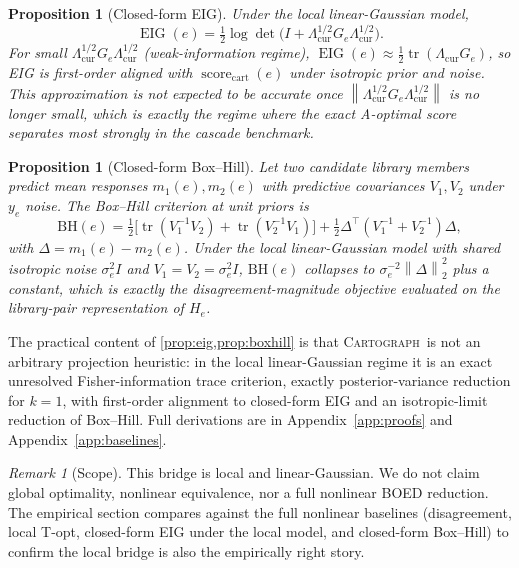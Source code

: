 \documentclass{article}
\newcommand{\method}{\textsc{Cartograph}}
\newcommand{\scorecart}{\operatorname{score}_{\mathrm{cart}}}
\newcommand{\tr}{\operatorname{tr}}
\newcommand{\EIG}{\operatorname{EIG}}
\newcommand{\norm}[1]{\left\lVert #1 \right\rVert}
\theoremstyle{plain}
\newtheorem{proposition}[theorem]{Proposition}
\theoremstyle{definition}
\theoremstyle{remark}
\newtheorem{remark}[theorem]{Remark}
\begin{document}
\begin{proposition}[Closed-form EIG]
\label{prop:eig}
Under the local linear-Gaussian model,
\begin{equation}
\EIG(e) = \tfrac{1}{2}\log\det\!\big(I+\Lambda_{\mathrm{cur}}^{1/2}G_e\Lambda_{\mathrm{cur}}^{1/2}\big).
\label{eq:eig}
\end{equation}
For small $\Lambda_{\mathrm{cur}}^{1/2}G_e\Lambda_{\mathrm{cur}}^{1/2}$
(weak-information regime), $\EIG(e)\approx\tfrac{1}{2}\tr(\Lambda_{\mathrm{cur}}G_e)$,
so EIG is first-order aligned with $\scorecart(e)$ under isotropic prior
and noise. This approximation is not expected to be accurate once
$\norm{\Lambda_{\mathrm{cur}}^{1/2}G_e\Lambda_{\mathrm{cur}}^{1/2}}$ is no
longer small, which is exactly the regime where the exact A-optimal score
separates most strongly in the cascade benchmark.
\end{proposition}

\begin{proposition}[Closed-form Box--Hill]
\label{prop:boxhill}
Let two candidate library members predict mean responses $m_1(e),m_2(e)$
with predictive covariances $V_1,V_2$ under $y_e$ noise. The Box--Hill
criterion \citep{boxhill1967} at unit priors is
\begin{equation}
\mathrm{BH}(e)=\tfrac{1}{2}\big[\tr(V_1^{-1}V_2)+\tr(V_2^{-1}V_1)\big]+\tfrac{1}{2}\Delta^\top(V_1^{-1}+V_2^{-1})\Delta,
\label{eq:bh}
\end{equation}
with $\Delta=m_1(e)-m_2(e)$. Under the local linear-Gaussian model with
shared isotropic noise $\sigma_e^2 I$ and $V_1\!=\!V_2\!=\!\sigma_e^2 I$,
$\mathrm{BH}(e)$ collapses to
$\sigma_e^{-2}\norm{\Delta}_2^2$ plus a constant, which is exactly the
disagreement-magnitude objective evaluated on the library-pair
representation of $H_e$.
\end{proposition}

The practical content of \cref{prop:eig,prop:boxhill} is that \method\ is
not an arbitrary projection heuristic: in the local linear-Gaussian regime
it is an exact unresolved Fisher-information trace criterion, exactly
posterior-variance reduction for $k\!=\!1$, with first-order alignment to
closed-form EIG and an isotropic-limit reduction of Box--Hill. Full derivations are in Appendix~\ref{app:proofs} and
Appendix~\ref{app:baselines}.

\begin{remark}[Scope]
This bridge is local and linear-Gaussian. We do not claim global optimality,
nonlinear equivalence, nor a full nonlinear BOED reduction. The empirical
section compares against the full nonlinear baselines (disagreement, local
T-opt, closed-form EIG under the local model, and closed-form Box--Hill)
to confirm the local bridge is also the empirically right story.
\end{remark}
\end{document}
